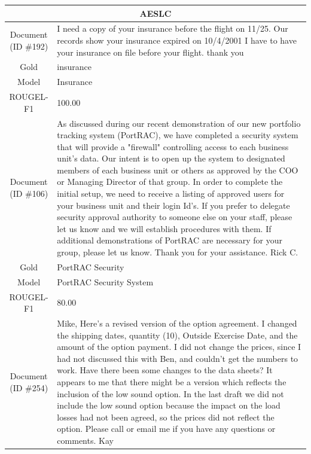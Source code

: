 \begin{table}[bth!]
\scriptsize
\centering
\renewcommand{\arraystretch}{1.3}
\begin{tabular}{c|p{}}
\hline
\multicolumn{2}{c}{AESLC} \\ \hline
\makecell{Document\\(ID \#192)} & 
I need a copy of your insurance before the flight on 11/25. Our records show your insurance expired on 10/4/2001 I have to have your insurance on file before your flight. thank you
\\ \hline
Gold & 
insurance
\\ \hline
Model & 
Insurance
\\ \hline
ROUGEL-F1 & 
100.00
\\ \hline
\makecell{Document\\(ID \#106)} & 
As discussed during our recent demonstration of our new portfolio tracking system (PortRAC), we have completed a security system that will provide a "firewall" controlling access to each business unit's data. Our intent is to open up the system to designated members of each business unit or others as approved by the COO or Managing Director of that group. In order to complete the initial setup, we need to receive a listing of approved users for your business unit and their login Id's. If you prefer to delegate security approval authority to someone else on your staff, please let us know and we will establish procedures with them. If additional demonstrations of PortRAC are necessary for your group, please let us know. Thank you for your assistance. Rick C.
\\ \hline
Gold & 
PortRAC Security
\\ \hline
Model & 
PortRAC Security System
\\ \hline
ROUGEL-F1 & 
80.00
\\ \hline
\makecell{Document\\(ID \#254)} & 
Mike, Here's a revised version of the option agreement. I changed the shipping dates, quantity (10), Outside Exercise Date, and the amount of the option payment. I did not change the prices, since I had not discussed this with Ben, and couldn't get the numbers to work. Have there been some changes to the data sheets? It appears to me that there might be a version which reflects the inclusion of the low sound option. In the last draft we did not include the low sound option because the impact on the load losses had not been agreed, so the prices did not reflect the option. Please call or email me if you have any questions or comments. Kay

\end{tabular}
\end{table}
